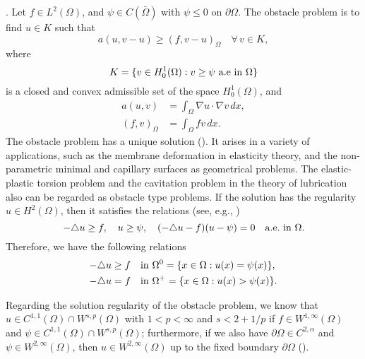 \documentclass[12pt]{article}
\begin{document}
. Let $f\in L^2(\Omega)$, and $\psi \in C(\bar{\Omega})$ with $\psi \leq 0$ on $\partial\Omega$.
The obstacle problem is to find $u \in K$ such that
\begin{equation}\label{vi}
a(u,v-u) \geq (f,v-u)_\Omega \quad\forall\, v \in K,
\end{equation}
where
\begin{equation}\label{admi}
K=\{v\in H^1_0(\Omega): v\geq\psi\ {\rm a.e\ in}\ \Omega\}
\end{equation}
is a closed and convex admissible set of the space $H^1_0(\Omega)$, and
\begin{align*}
a(u,v) & =\int_\Omega \nabla u\cdot\nabla v\, dx, \\
(f,v)_\Omega &=\int_\Omega  f v \, dx. 
\end{align*}
The obstacle problem has a unique solution (\cite{duvaut76}).
It arises in a variety of
applications, such as the membrane deformation in elasticity
theory, and the non-parametric minimal and capillary surfaces as
geometrical problems. The elastic-plastic torsion problem and the
cavitation problem in the theory of lubrication also can be
regarded as obstacle type problems. If the solution has the regularity $u
\in H^2(\Omega)$, then it satisfies the relations (see, e.g., \cite{atkinson05})
\begin{equation}\label{pde}
 -\triangle u\geq f ,  \quad u\geq \psi , \quad
(-\triangle u- f)(u- \psi)=0 \quad {\rm a.e.\ in\ }\Omega.
\end{equation}
Therefore, we have the following relations
\begin{align*}
 -\triangle u &\geq f\quad {\rm in}\ \Omega^0 = \{x\in \Omega:u(x) = \psi(x)\},\\
 -\triangle u&=f\quad {\rm in}\ \Omega^+=\{x\in\Omega:u(x)>\psi(x)\}.
\end{align*}


{\color{red}
Regarding the solution regularity of the obstacle problem, we know that $u\in C^{1,1}(\Omega)\cap W^{s,p}(\Omega)$ with $1<p<\infty$ and $s<2+1/p$ if $f\in W^{1,\infty}(\Omega)$ and $\psi\in C^{1,1}(\Omega)\cap W^{s,p}(\Omega)$; furthermore,  if we also have $\partial\Omega\in C^{2,\alpha}$ and $\psi\in W^{2,\infty}(\Omega)$, then $u\in W^{2,\infty}(\Omega)$ up to the fixed boundary $\partial\Omega$ (\cite{friedman82,kinderlehrer80}). 
}
\end{document}
